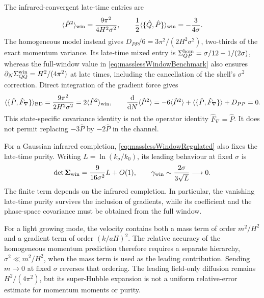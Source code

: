\documentclass{article}
\numberwithin{equation}{section}
\begin{document}
The infrared-convergent late-time entries are
\begin{equation}
 \langle\hat P^2\rangle_{\rm win}=\frac{9\pi^2}{4H^2\sigma^2},\qquad
 \frac12\langle\{\hat Q,\hat P\}\rangle_{\rm win}=-\frac{3}{4\sigma}.
 \label{eq:masslessWindowBenchmark}
\end{equation}
The homogeneous model instead gives $D_{PP}/6=3\pi^2/(2H^2\sigma^2)$, two-thirds of the exact momentum variance. Its late-time mixed entry is $\Sigma_{QP}^{\rm hom}=\sigma/12-1/(2\sigma)$, whereas the full-window value in \cref{eq:masslessWindowBenchmark} also ensures $\partial_N\Sigma_{QQ}^{\rm win}=H^2/(4\pi^2)$ at late times, including the cancellation of the shell's $\sigma^2$ correction. Direct integration of the gradient force gives
\begin{equation}
 \langle\{\hat P,\hat F_\nabla\}\rangle_{\rm BD}
 =\frac{9\pi^2}{2H^2\sigma^2}=2\langle\hat P^2\rangle_{\rm win},\qquad
 \frac{\dd}{\dd N}\langle\hat P^2\rangle
 =-6\langle\hat P^2\rangle+\langle\{\hat P,\hat F_\nabla\}\rangle+D_{PP}=0.
 \label{eq:gradientVarianceBalance}
\end{equation}
This state-specific covariance identity is not the operator identity $\hat F_\nabla=\hat P$. It does not permit replacing $-3\hat P$ by $-2\hat P$ in the channel.

For a Gaussian infrared completion, \cref{eq:masslessWindowRegulated} also fixes the late-time purity. Writing $L=\ln(k_\sigma/k_0)$, its leading behaviour at fixed $\sigma$ is
\begin{equation}
 \det\mathbf\Sigma_{\rm win}=\frac{9}{16\sigma^2}L+O(1),\qquad
 \gamma_{\rm win}\sim\frac{2\sigma}{3\sqrt L}\longrightarrow0.
 \label{eq:masslessWindowPurity}
\end{equation}
The finite term depends on the infrared completion. In particular, the vanishing late-time purity survives the inclusion of gradients, while its coefficient and the phase-space covariance must be obtained from the full window.

For a light growing mode, the velocity contains both a mass term of order $m^2/H^2$ and a gradient term of order $(k/aH)^2$. The relative accuracy of the homogeneous momentum prediction therefore requires a separate hierarchy, $\sigma^2\ll m^2/H^2$, when the mass term is used as the leading contribution. Sending $m\to0$ at fixed $\sigma$ reverses that ordering. The leading field-only diffusion remains $H^2/(4\pi^2)$, but its super-Hubble expansion is not a uniform relative-error estimate for momentum moments or purity.
\end{document}
